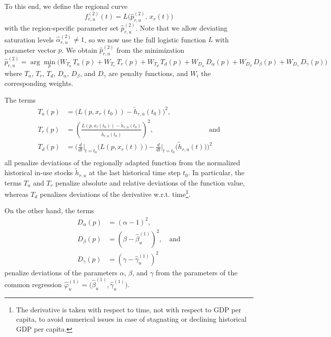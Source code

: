 To this end, we define the regional curve
\begin{equation}
f^{(2)}_{r,u}(t) = L\big(\hat{p}^{(2)}_{r,u},\,x_r(t)\big)
\end{equation}
with the region-specific parameter set $\hat{p}^{(2)}_{r,u}$. Note that we allow deviating saturation levels $\hat{\alpha}^{(2)}_{r,u} \neq 1$, so we now use the full logistic function $L$ with parameter vector $p$. We obtain $\hat{p}^{(2)}_{r,u}$ from the minimization
\begin{equation}
    \hat{p}^{(2)}_{r,u} = \arg\min_{p} \Big( W_{T_a}\,T_a(p) + W_{T_r}\,T_r(p) + W_{T_d}\,T_d(p) + W_{D_\alpha}\,D_\alpha(p) + W_{D_\beta}\,D_\beta(p) + W_{D_\gamma}\,D_\gamma(p) \Big)
\end{equation}
where $T_a$, $T_r$, $T_d$, $D_\alpha$, $D_\beta$, and $D_\gamma$ are penalty functions, and $W_i$ the corresponding weights.

The terms
\begin{equation}
\begin{split}
    T_a(p) &= \big(L(p,x_r(t_{0}))-\tilde{h}_{r,u}(t_{0}) \big)^2, \\
    T_r(p) &= \left(\frac{L(p,x_r(t_{0}))-\tilde{h}_{r,u}(t_{0})}{\tilde{h}_{r,u}(t_{0})} \right)^2, \qquad\qquad\qquad\qquad\text{and} \\
    T_d(p) &= \Big(\frac{d}{d t}\Big|_{t=t_{0}}\big(L(p,x_r(t))\big)-\frac{d}{d t}\Big|_{t=t_{0}}\big(\tilde{h}_{r,u}(t)\big) \Big)^2 \\
\end{split}
\end{equation}
all penalize deviations of the regionally adapted function from the normalized historical in-use stocks $\tilde{h}_{r,u}$ at the last historical time step $t_{0}$.
In particular, the terms $T_a$ and $T_r$ penalize absolute and relative deviations of the function value, whereas $T_d$ penalizes deviations of the derivative w.r.t. time\footnote{The derivative is taken with respect to time, not with respect to GDP per capita, to avoid numerical issues in case of stagnating or declining historical GDP per capita.}.

On the other hand, the terms
\begin{equation}
\begin{split}
    D_\alpha(p) &= (\alpha-1)^2, \\
    D_\beta(p) &= (\beta-\hat{\beta}^{(1)}_{u})^2, \quad\text{and} \\
    D_\gamma(p) &= (\gamma-\hat{\gamma}^{(1)}_{u})^2
\end{split}
\end{equation}
penalize deviations of the parameters $\alpha$, $\beta$, and $\gamma$ from the parameters of the common regression $\hat{\varphi}^{(1)}_u = \bigl(\hat{\beta}^{(1)}_{u}, \hat{\gamma}^{(1)}_{u}\bigr)$.

